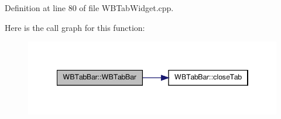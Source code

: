 Definition at line 80 of file W\-B\-Tab\-Widget.\-cpp.



Here is the call graph for this function\-:
\nopagebreak
\begin{figure}[H]
\begin{center}
\leavevmode
\includegraphics[width=346pt]{df/d78/class_w_b_tab_bar_a059a3b50612d69cebed1c5ba1b2392eb_cgraph}
\end{center}
\end{figure}




